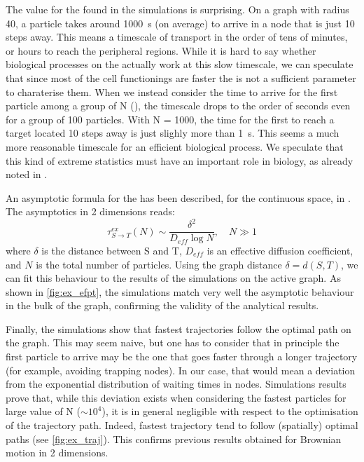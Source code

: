 The value for the  found in the simulations is surprising. On a graph with radius 40, a particle takes around \SI{1000}{\second} (on average) to arrive in a node that is just 10 steps away. This means a timescale of transport in the order of tens of minutes, or hours to reach the peripheral regions. While it is hard to say whether biological processes on the  actually work at this slow timescale, we can speculate that since most of the cell functionings are faster the  is not a sufficient parameter to charaterise them. When we instead consider the time to arrive for the first particle among a group of N (), the timescale drops to the order of seconds even for a group of 100 particles. With N = 1000, the time for the first to reach a target located 10 steps away is just slighly more than \SI{1}{\second}. This seems a much more reasonable timescale for an efficient biological process. We speculate that this kind of extreme statistics must have an important role in biology, as already noted in \cite{reynaud2015,basnayake2017,basnayake2018}.

An asymptotic formula for the  has been described, for the continuous space, in . The asymptotics in 2 dimensions reads:
\begin{equation}
  \tau^{ex}_{S \to T}(N) \sim \frac{\delta^2}{D_{eff} \log N},\quad N \gg 1
\end{equation}
where $\delta$ is the distance between S and T, $D_{eff}$ is an effective diffusion coefficient, and $N$ is the total number of particles. Using the graph distance $\delta = d(S, T)$, we can fit this behaviour to the results of the simulations on the active graph. As shown in \cref{fig:ex_efpt}, the simulations match very well the asymptotic behaviour in the bulk of the graph, confirming the validity of the analytical results.

Finally, the simulations show that fastest trajectories follow the optimal path on the graph. This may seem naive, but one has to consider that in principle the first particle to arrive may be the one that goes faster through a longer trajectory (for example, avoiding trapping nodes). In our case, that would mean a deviation from the exponential distribution of waiting times in nodes. Simulations results prove that, while this deviation exists when considering the fastest particles for large value of N ($\sim 10^4$), it is in general negligible with respect to the optimisation of the trajectory path. Indeed, fastest trajectory tend to follow (spatially) optimal paths (see \cref{fig:ex_traj}). This confirms previous results obtained for Brownian motion in 2 dimensions.

